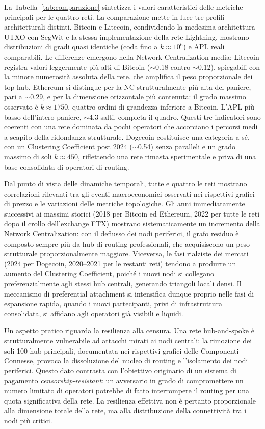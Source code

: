 \documentclass[12pt,a4paper,oneside]{book}
\begin{document}
La Tabella~\ref{tab:comparazione} sintetizza i valori caratteristici delle metriche principali per le quattro reti. La comparazione mette in luce tre profili architetturali distinti. Bitcoin e Litecoin, condividendo la medesima architettura UTXO con SegWit e la stessa implementazione della rete Lightning, mostrano distribuzioni di gradi quasi identiche (coda fino a $k \approx 10^6$) e APL reali comparabili. Le differenze emergono nella Network Centralization media: Litecoin registra valori leggermente più alti di Bitcoin ($\sim$0.18 contro $\sim$0.12), spiegabili con la minore numerosità assoluta della rete, che amplifica il peso proporzionale dei top hub. Ethereum si distingue per la NC strutturalmente più alta del paniere, pari a $\sim$0.29, e per la dimensione orizzontale più contenuta: il grado massimo osservato è $k \approx 1750$, quattro ordini di grandezza inferiore a Bitcoin. L'APL più basso dell'intero paniere, $\sim$4.3 salti, completa il quadro. Questi tre indicatori sono coerenti con una rete dominata da pochi operatori che accorciano i percorsi medi a scapito della ridondanza strutturale. Dogecoin costituisce una categoria a sé, con un Clustering Coefficient post 2024 ($\sim$0.54) senza paralleli e un grado massimo di soli $k \approx 450$, riflettendo una rete rimasta sperimentale e priva di una base consolidata di operatori di routing.

Dal punto di vista delle dinamiche temporali, tutte e quattro le reti mostrano correlazioni rilevanti tra gli eventi macroeconomici osservati nei rispettivi grafici di prezzo e le variazioni delle metriche topologiche. Gli anni immediatamente successivi ai massimi storici (2018 per Bitcoin ed Ethereum, 2022 per tutte le reti dopo il crollo dell'exchange FTX) mostrano sistematicamente un incremento della Network Centralization: con il deflusso dei nodi periferici, il grafo residuo è composto sempre più da hub di routing professionali, che acquisiscono un peso strutturale proporzionalmente maggiore. Viceversa, le fasi rialziste dei mercati (2024 per Dogecoin, 2020--2021 per le restanti reti) tendono a produrre un aumento del Clustering Coefficient, poiché i nuovi nodi si collegano preferenzialmente agli stessi hub centrali, generando triangoli locali densi. Il meccanismo di preferential attachment si intensifica dunque proprio nelle fasi di espansione rapida, quando i nuovi partecipanti, privi di infrastruttura consolidata, si affidano agli operatori già visibili e liquidi.

Un aspetto pratico riguarda la resilienza alla censura. Una rete hub-and-spoke è strutturalmente vulnerabile ad attacchi mirati ai nodi centrali: la rimozione dei soli 100 hub principali, documentata nei rispettivi grafici delle Componenti Connesse, provoca la dissoluzione del nucleo di routing e l'isolamento dei nodi periferici. Questo dato contrasta con l'obiettivo originario di un sistema di pagamento \textit{censorship-resistant}: un avversario in grado di compromettere un numero limitato di operatori potrebbe di fatto interrompere il routing per una quota significativa della rete. La resilienza effettiva non è pertanto proporzionale alla dimensione totale della rete, ma alla distribuzione della connettività tra i nodi più critici.
\end{document}

